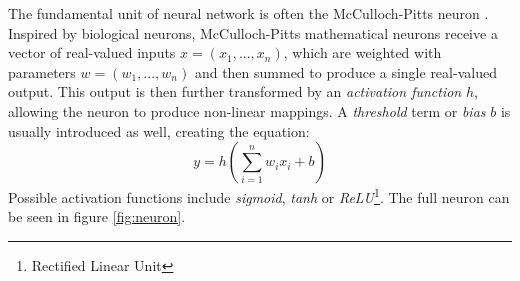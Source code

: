 The fundamental unit of neural network is often the McCulloch-Pitts neuron \cite{first-neuron}. Inspired by biological neurons, McCulloch-Pitts mathematical neurons receive a vector of real-valued inputs $x = (x_1, ..., x_n)$, which are weighted with parameters $w = (w_1, ..., w_n)$ and then summed to produce a single real-valued output. This output is then further transformed by an \textit{activation function} $h$, allowing the neuron to produce non-linear mappings. A \textit{threshold} term or \textit{bias} $b$ is usually introduced as well, creating the equation:
\begin{equation*}
    y = h\left(\sum_{i=1}^n w_i x_i + b \right)
\end{equation*}
Possible activation functions include \textit{sigmoid}, \textit{tanh} or \textit{ReLU}\footnote{Rectified Linear Unit}. The full neuron can be seen in figure \ref{fig:neuron}.
